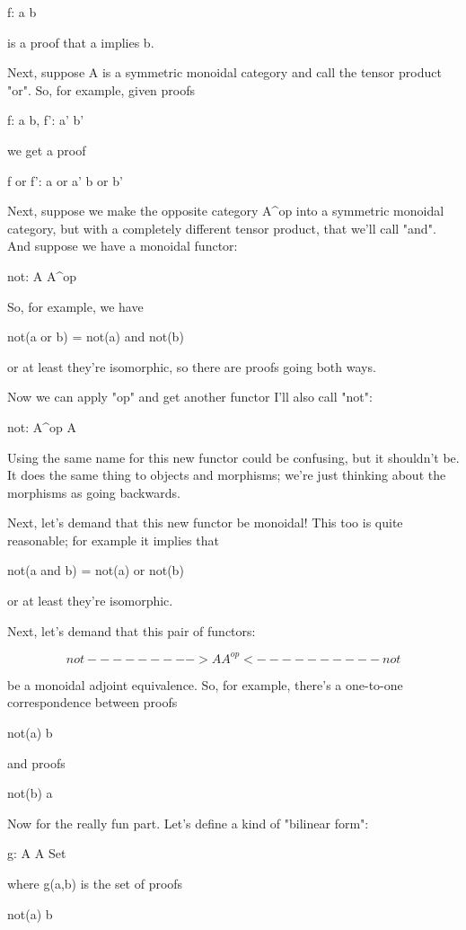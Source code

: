 f: a \to  b


is a proof that a implies b. 

Next, suppose A is a symmetric monoidal category and call the tensor
product "or".  So, for example, given proofs

f: a \to  b,  f': a' \to  b'

we get a proof

f or f': a or a' \to  b or b'


Next, suppose we make the opposite category A^{op} into a
symmetric monoidal category, but with a completely different tensor
product, that we'll call "and".  And suppose we have a
monoidal functor:

not: A \to  A^{op}

So, for example, we have

not(a or b) = not(a) and not(b)

or at least they're isomorphic, so there are proofs going both ways.  

Now we can apply "op" and get another functor I'll also call
"not":

not: A^{op} \to  A

Using the same name for this new functor could be confusing, but it 
shouldn't be.  It does the same thing to objects and morphisms; we're
just thinking about the morphisms as going backwards.
 
Next, let's demand that this new functor be monoidal!  This too is 
quite reasonable; for example it implies that

not(a and b) = not(a) or not(b)

or at least they're isomorphic.

Next, let's demand that this pair of functors:


$$

      not
   --------->
A             A^{op}
  <----------
      not

$$
    
be a monoidal adjoint equivalence.  So, for example, there's a
one-to-one correspondence between proofs

not(a) \to  b

and proofs

not(b) \to  a

Now for the really fun part.
Let's define a kind of "bilinear form":

g: A \times  A \to  Set

where g(a,b) is the set of proofs 

not(a) \to  b

